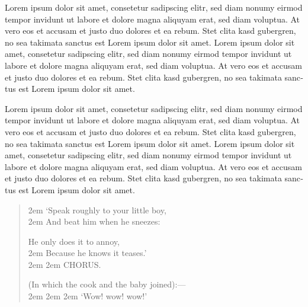 \documentclass[a5paper]{book}
\begin{document}
\begin{german}
\medskip\noindent\hspace*{\fill}\hrulefill\hspace*{\fill}\par\medskip\noindent

Lorem ipsum dolor sit amet, consetetur sadipscing elitr, sed diam
nonumy eirmod tempor invidunt ut labore et dolore magna aliquyam erat,
sed diam voluptua. At vero eos et accusam et justo duo dolores et ea
rebum. Stet clita kasd gubergren, no sea takimata sanctus est Lorem
ipsum dolor sit amet. Lorem ipsum dolor sit amet, consetetur
sadipscing elitr, sed diam nonumy eirmod tempor invidunt ut labore et
dolore magna aliquyam erat, sed diam voluptua. At vero eos et accusam
et justo duo dolores et ea rebum. Stet clita kasd gubergren, no sea
takimata sanctus est Lorem ipsum dolor sit amet.\par

Lorem ipsum dolor sit amet, consetetur sadipscing elitr, sed diam
nonumy eirmod tempor invidunt ut labore et dolore magna aliquyam erat,
sed diam voluptua. At vero eos et accusam et justo duo dolores et ea
rebum. Stet clita kasd gubergren, no sea takimata sanctus est Lorem
ipsum dolor sit amet. Lorem ipsum dolor sit amet, consetetur
sadipscing elitr, sed diam nonumy eirmod tempor invidunt ut labore et
dolore magna aliquyam erat, sed diam voluptua. At vero eos et accusam
et justo duo dolores et ea rebum. Stet clita kasd gubergren, no sea
takimata sanctus est Lorem ipsum dolor sit amet.\par

\begin{container}
\begin{center}
\begin{verse}
{\advance\leftskip2em{}
‘Speak roughly to your little boy, \\
{\advance\leftskip2em{}
And beat him when he sneezes: \\}

He only does it to annoy, \\
{\advance\leftskip2em{}
Because he knows it teases.’ \\
\vspace*{1em}
{\advance\leftskip2em{}
{\advance\leftskip2em{}
CHORUS. \\
\vspace*{1em}}}}}

(In which the cook and the baby joined):— \\
\vspace*{1em}
{\advance\leftskip2em{}
{\advance\leftskip2em{}
{\advance\leftskip2em{}
‘Wow! wow! wow!’ \\}}}
\end{verse}


\end{center}
\end{container}
\end{german}
\end{document}
